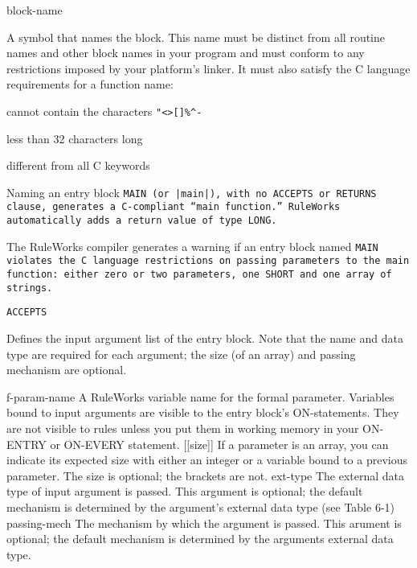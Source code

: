 
  

\begin{arguments}
\item[block-name]

  A symbol that names the block. This name must be distinct from all
  routine names and other block names in your program and must conform
  to any restrictions imposed by your platform's linker. It must also
  satisfy the C language requirements for a function name:

  \qquad cannot contain the characters \verb,"<>[]%^-,

  \qquad less than 32 characters long

  \qquad different from all C keywords
\end{arguments}

\begin{note}
  Naming an entry block \tt{MAIN} (or \verb,|main|,), with no
  \tt{ACCEPTS} or \tt{RETURNS} clause, generates a C-compliant ``main
  function.''  RuleWorks automatically adds a return value of type
  \tt{LONG}.
\end{note}

The RuleWorks compiler generates a warning if an entry block named
\tt{MAIN} violates the C language restrictions on passing parameters
to the main function: either zero or two parameters, one \tt{SHORT}
and one array of strings.

\Clauses

\tt{ACCEPTS}

Defines the input argument list of the entry block. Note that the name
and data type are required for each argument; the size (of an array)
and passing mechanism are optional.

f-param-name A RuleWorks variable name for the formal
parameter.
Variables bound to input arguments are visible
to the entry block's ON-statements. They are not
visible to rules unless you put them in working
memory in your ON-ENTRY or ON-EVERY statement.
[[size]]     If a parameter is an array, you can indicate its
expected size with either an integer or a
variable bound to a previous parameter. The size
is optional; the brackets are not.
ext-type     The external data type of input argument is
passed. This argument is optional; the default
mechanism is determined by the argument's
external data type (see Table 6-1)
passing-mech The mechanism by which the argument is passed.
This arument is optional; the default mechanism
is determined by the arguments external data
type.

